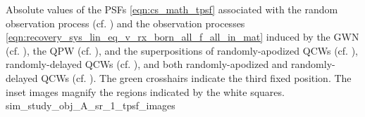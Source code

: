 %
{%
 Absolute values of
 the \aclp{PSF}
 \eqref{eqn:cs_math_tpsf} associated with
 the random observation process
 (cf. ) and
 the observation processes
 \eqref{eqn:recovery_sys_lin_eq_v_rx_born_all_f_all_in_mat} induced by
 the \acl{GWN}
 (cf. ),
 the \acl{QPW}
 (cf. ), and
 the superpositions of
 randomly-apodized \acfp{QCW}
 (cf. ),
 randomly-delayed \acp{QCW}
 (cf. ), and both
 randomly-apodized and
 randomly-delayed \acp{QCW}
 (cf. ).
 The green crosshairs indicate
 the third fixed position.
 The inset images magnify
 the regions indicated by
 the white squares.
}%
{sim_study_obj_A_sr_1_tpsf_images}


